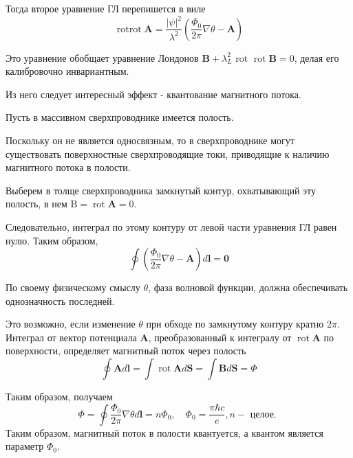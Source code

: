 \documentclass[a4paper,12pt]{article} %
\begin{document}
\begin{task}
Тогда второе уравнение ГЛ перепишется в виле
$$
\operatorname{rotrot} \mathbf{A}
=
\frac{|\psi|^{2}}{\lambda^{2}}
\left(
\frac{\Phi_{0}}{2 \pi} \nabla \theta-\mathbf{A}
\right)
$$


Это уравнение обобщает уравнение Лондонов 
$\mathbf{B}+\lambda_{L}^{2} \text { rot } \operatorname{rot} \mathbf{B}=0$, 
делая его калибровочно инвариантным. 



Из него следует интересный эффект - 
квантование магнитного потока. 



Пусть в массивном сверхпроводнике имеется полость. 


Поскольку он не является односвязным, 
то в сверхпроводнике могут существовать поверхностные сверхпроводящие токи, приводящие к наличию магнитного потока в полости. 

Выберем в толще сверхпроводника замкнутый контур, охватывающий эту полость, в нем $\mathrm{B}= \operatorname{rot} \mathbf{A}=0 .$ 

Следовательно, интеграл по этому контуру от левой части уравнения ГЛ равен нулю. 
Таким образом,
$$
\oint\left(
\frac{\Phi_{0}}{2 \pi} \nabla \theta-\mathbf{A}
\right) d \mathbf{l}
=
\mathbf{0}
$$




По своему физическому смыслу $\theta$, 
фаза волновой функции, 
должна обеспечивать однозначность последней. 

Это возможно, если изменение $\theta$ при обходе по замкнутому контуру кратно $2 \pi$. 
Интеграл от вектор потенциала $ \mathbf{A} $, 
преобразованный к интегралу от $ \operatorname{rot} \mathbf{A} $ по поверхности, 
определяет магнитный поток через полость
$$
\oint \mathbf{A} d \mathbf{l}
=
\int \operatorname{rot} \mathbf{A} d \mathbf{S}
=
\int \mathbf{B} d \mathbf{S}
=
\Phi
$$


Таким образом, получаем
$$
\Phi=
\oint 
\frac{\Phi_{0}}{2 \pi} 
\nabla \theta d \mathbf{l}
=
n \Phi_{0}, 
\quad 
\Phi_{0}=\frac{\pi \hbar c}{e}, n-\text { целое. }
$$
Таким образом, магнитный поток в полости квантуется, 
а квантом является параметр $\Phi_{0}$.








\end{task}
\end{document}
